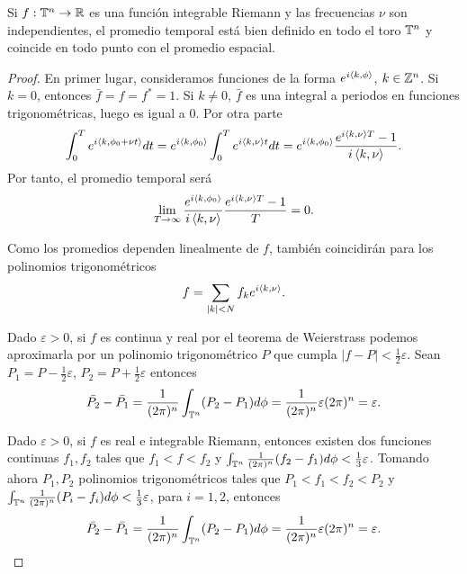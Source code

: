 \begin{thm}
  Si $f:\mathbb{T}^n \rightarrow \mathbb{R}$ es una función integrable Riemann y las frecuencias $\nu$ son independientes, el promedio temporal está bien definido en todo el toro $\mathbb{T}^n$ y coincide en todo punto con el promedio espacial.
\end{thm}
\begin{proof}
    En primer lugar, consideramos funciones de la forma $e^{i\left\langle k,\phi\right\rangle}$, $k\in \mathbb{Z}^n$. Si $k=0$, entonces $\bar{f}=f=f^*=1$. Si $k\neq0$, $\bar{f}$ es una integral a periodos en funciones trigonométricas, luego es igual a 0. Por otra parte
     \begin{equation*}
       \int_0^T e^{i\left\langle k,\phi_0 + \nu t\right\rangle} dt= e^{i\left\langle k,\phi_0\right\rangle}\int_0^T e^{i\left\langle k,\nu\right\rangle t}dt=e^{i\left\langle k,\phi_0\right\rangle}\frac{e^{i\left\langle k,\nu\right\rangle T}-1}{i \left\langle k,\nu\right\rangle}.
     \end{equation*}
     Por tanto, el promedio temporal será
     \begin{equation*}
       \lim_{T\rightarrow \infty}\frac{e^{i\left\langle k,\phi_0\right\rangle}}{i \left\langle k,\nu\right\rangle}\frac{e^{i\left\langle k,\nu\right\rangle T}-1}{T}=0.
     \end{equation*}
     
    Como los promedios dependen linealmente de $f$, también coincidirán para los polinomios trigonométricos
     \begin{equation*}
       f=\sum_{|k|<N}f_ke^{i\left\langle k,\nu\right\rangle}.
     \end{equation*}

    Dado $\varepsilon >0$, si $f$ es continua y real por el teorema de Weierstrass podemos aproximarla por un polinomio trigonométrico $P$ que cumpla $|f-P|<\frac{1}{2}\varepsilon$. Sean $P_1=P-\frac{1}{2}\varepsilon$, $P_2=P+\frac{1}{2}\varepsilon$ entonces
     \begin{equation*}
       \bar{P_2}-\bar{P_1}=\frac{1}{(2\pi)^n}\int_{\mathbb{T}^n} (P_2 - P_1) d\phi = \frac{1}{(2\pi)^n}\varepsilon (2\pi)^n= \varepsilon.
     \end{equation*}

    Dado $\varepsilon >0$, si $f$ es real e integrable Riemann, entonces existen dos funciones continuas $f_1,f_2$ tales que $f_1<f<f_2$ y $\int_{\mathbb{T}^n}\frac{1}{(2\pi)^n}(f_2-f_1)d\phi<\frac{1}{3}\varepsilon$. Tomando ahora $P_1,P_2$ polinomios trigonométricos tales que $P_1<f_1<f_2<P_2$ y $\int_{\mathbb{T}^n}\frac{1}{(2\pi)^n}(P_i-f_i)d\phi < \frac{1}{3}\varepsilon$, para $i=1,2$, entonces
     \begin{equation*}
       \bar{P_2}-\bar{P_1}=\frac{1}{(2\pi)^n}\int_{\mathbb{T}^n} (P_2 - P_1) d\phi = \frac{1}{(2\pi)^n}\varepsilon (2\pi)^n= \varepsilon.
     \end{equation*}


\end{proof}
